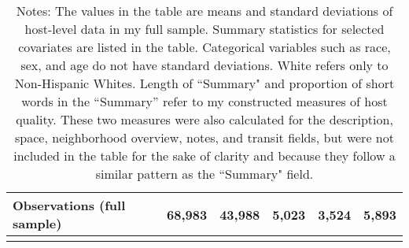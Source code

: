 {\begin{longtable}{l*{6}{c}}
		
		\hline
		Observations (full sample)    &  & 68,983   &       43,988         &       5,023         &       3,524         &       5,893         \\
		\hline\hline
		\caption*{Notes: The values in the table are means and standard deviations of host-level data in my full sample. Summary statistics for selected covariates are listed in the table. Categorical variables such as race, sex, and age do not have standard deviations. White refers only to Non-Hispanic Whites. Length of ``Summary" and proportion of short words in the ``Summary'' refer to my constructed measures of host quality. These two measures were also calculated for the description, space, neighborhood overview, notes, and transit fields, but were not included in the table for the sake of clarity and because they follow a similar pattern as the ``Summary" field.}
		
	\end{longtable}
}

